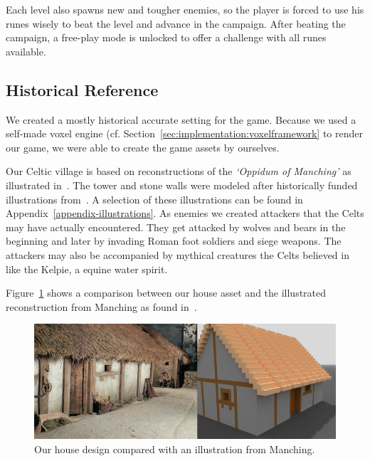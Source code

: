Each level also spawns new and tougher enemies, so the player is forced to use his runes wisely to beat the level and advance in the campaign.
After beating the campaign, a free-play mode is unlocked to offer a challenge with all runes available.


\subsection{Historical Reference}
\label{sec:game_design:subsec:history}

We created a mostly historical accurate setting for the game. Because we used a self-made voxel engine (cf. Section~\ref{sec:implementation:voxelframework} to render our game, we were able to create the game assets by ourselves.

Our Celtic village is based on reconstructions of the \textit{`Oppidum of Manching'} as illustrated in~\cite{kraemer-oppidum-maching}. The tower and stone walls were modeled after historically funded illustrations from~\cite{kraemer-oppidum-maching}\cite{rieckhoff-walls1}\cite{rieckhoff-walls2}\cite{rieckhoff-tower}. A selection of these illustrations can be found in Appendix~\ref{appendix-illustrations}. As enemies we created attackers that the Celts may have actually encountered.
They get attacked by wolves and bears in the beginning and later by invading Roman foot soldiers and siege weapons.
The attackers may also be accompanied by mythical creatures the Celts believed in like the Kelpie, a equine water spirit.

Figure~\ref{fig:house-comparison} shows a comparison between our house asset and the illustrated reconstruction from Manching as found in~\cite{kraemer-oppidum-maching}.

\begin{figure}[ht]
	\centering
	\includegraphics[width=\linewidth]{figures/house_comparison.png}
	\caption{Our house design compared with an illustration from Manching.}
	\label{fig:house-comparison}
\end{figure}

